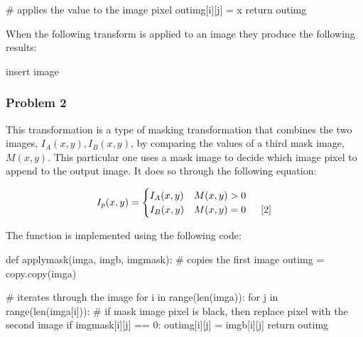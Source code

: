 \documentclass{article}
\begin{document}
\indent \indent \indent		\# applies the value to the image pixel \newline
\indent \indent \indent		out\textunderscore img[i][j] = x \newline
\newline
\indent	return out\textunderscore img \newline

When the following transform is applied to an image they produce the following results: \newline

insert image

\subsubsection{Problem 2}

This transformation is a type of masking transformation that combines the two images, $ I_{A}(x,y), I_{B}(x,y)$, by comparing the values of a third mask image, $ M(x,y) $. This particular one uses a mask image to decide which image pixel to append to the output image. It does so through the following equation: \newline

\[ I_{p}(x,y) = \begin{cases} 
I_{A}(x,y) & M(x,y) > 0\\
I_{B}(x,y) & M(x,y) = 0  \indent [2]
\end{cases}
\] \newline

\noindent The function is implemented using the following code: \newline

\noindent def apply\textunderscore mask(img\textunderscore a, img\textunderscore b, img\textunderscore mask): \newline
\newline
\indent \# copies the first image \newline
\indent \indent out\textunderscore img = copy.copy(img\textunderscore a) \newline

\indent \# iterates through the image \newline
\indent for i in range(len(img\textunderscore a)): \newline
\indent \indent for j in range(len(img\textunderscore a[i])): \newline
\newline
\indent \indent \indent\# if mask image pixel is black, then replace pixel with the second image \newline
\indent \indent \indent if img\textunderscore mask[i][j] == 0: \newline
\newline
\indent \indent \indent \indent out\textunderscore img[i][j] = img\textunderscore b[i][j] \newline
\newline
\indent return out\textunderscore img \newline
\end{document}
